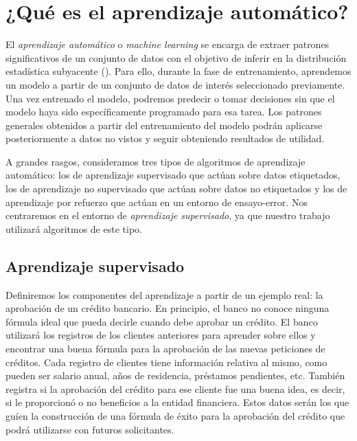 \documentclass[oneside,openright,titlepage,numbers=noenddot,openany,headinclude,footinclude=true,
cleardoublepage=empty,abstractoff,BCOR=5mm,paper=a4,fontsize=12pt,main=spanish]{scrreprt}
\begin{document}
\section{¿Qué es el aprendizaje automático?}

\label{sec:queaprendizaje}

El \textit{aprendizaje automático} o \textit{machine learning} se encarga de extraer patrones significativos de un conjunto de datos con el objetivo de inferir en la distribución estadística subyacente (\cite{pattern2006}). Para ello, durante la fase de entrenamiento, aprendemos un modelo a partir de un conjunto de datos de interés seleccionado previamente. Una vez entrenado el modelo, podremos predecir o tomar decisiones sin que el modelo haya sido específicamente programado para esa tarea. Los patrones generales obtenidos a partir del entrenamiento del modelo podrán aplicarse posteriormente a datos no vistos y seguir obteniendo resultados de utilidad. 

A grandes rasgos, consideramos tres tipos de algoritmos de aprendizaje automático: los de aprendizaje supervisado que actúan sobre datos etiquetados, los de aprendizaje no supervisado que actúan sobre datos no etiquetados y los de aprendizaje por refuerzo que actúan en un entorno de ensayo-error. Nos centraremos en el entorno de \textit{aprendizaje supervisado}, ya que nuestro trabajo utilizará algoritmos de este tipo. 

\subsection{Aprendizaje supervisado}

\label{subsec:ejemplobanco}

Definiremos los componentes del aprendizaje a partir de un ejemplo real: la aprobación de un crédito bancario. En principio, el banco no conoce ninguna fórmula ideal que pueda decirle cuando debe aprobar un crédito. El banco utilizará los registros de los clientes anteriores para aprender sobre ellos y encontrar una buena fórmula para la aprobación de las nuevas peticiones de créditos. Cada registro de clientes tiene información relativa al mismo, como pueden ser salario anual, años de residencia, préstamos pendientes, etc. También registra si la aprobación del crédito para ese cliente fue una buena idea, es decir, si le proporcionó o no beneficios a la entidad financiera. Estos datos serán los que guíen la construcción de una fórmula de éxito para la aprobación del crédito que podrá utilizarse con futuros solicitantes.
\end{document}
